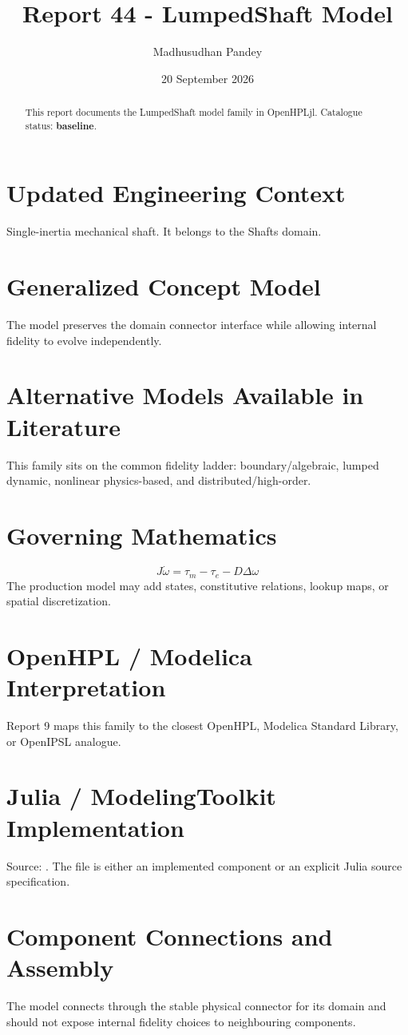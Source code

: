\documentclass[10pt,a4paper]{article}
\title{Report 44 - LumpedShaft Model}
\author{Madhusudhan Pandey}
\date{20 September 2026}
\begin{document}
\maketitle
\begin{abstract}This report documents the LumpedShaft model family in OpenHPLjl. Catalogue status: \textbf{baseline}.\end{abstract}
\section{Updated Engineering Context}Single-inertia mechanical shaft. It belongs to the Shafts domain.
\section{Generalized Concept Model}The model preserves the domain connector interface while allowing internal fidelity to evolve independently.
\section{Alternative Models Available in Literature}This family sits on the common fidelity ladder: boundary/algebraic, lumped dynamic, nonlinear physics-based, and distributed/high-order.
\section{Governing Mathematics}\[J\dot\omega=\tau_m-\tau_e-D\Delta\omega\]The production model may add states, constitutive relations, lookup maps, or spatial discretization.
\section{OpenHPL / Modelica Interpretation}Report 9 maps this family to the closest OpenHPL, Modelica Standard Library, or OpenIPSL analogue.
\section{Julia / ModelingToolkit Implementation}Source: \texttt{}. The file is either an implemented component or an explicit Julia source specification.
\section{Component Connections and Assembly}The model connects through the stable physical connector for its domain and should not expose internal fidelity choices to neighbouring components.
\end{document}
